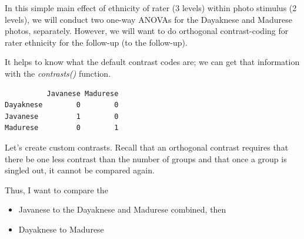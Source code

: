\documentclass[
  11pt,
]{book}
\newenvironment{Shaded}{\begin{snugshade}}{\end{snugshade}}
\newcommand{\CommentTok}[1]{\textcolor[rgb]{0.56,0.35,0.01}{\textit{#1}}}
\newcommand{\DecValTok}[1]{\textcolor[rgb]{0.00,0.00,0.81}{#1}}
\newcommand{\FunctionTok}[1]{\textcolor[rgb]{0.00,0.00,0.00}{#1}}
\newcommand{\NormalTok}[1]{#1}
\newcommand{\OtherTok}[1]{\textcolor[rgb]{0.56,0.35,0.01}{#1}}
\newcommand{\SpecialCharTok}[1]{\textcolor[rgb]{0.00,0.00,0.00}{#1}}
\providecommand{\tightlist}{%
  \setlength{\itemsep}{0pt}\setlength{\parskip}{0pt}}
\begin{document}
In this simple main effect of ethnicity of rater (3 levels) within photo stimulus (2 levels), we will conduct two one-way ANOVAs for the Dayaknese and Madurese photos, separately. However, we will want to do orthogonal contrast-coding for rater ethnicity for the follow-up (to the follow-up).

It helps to know what the default contrast codes are; we can get that information with the \emph{contrasts()} function.

\begin{Shaded}
\end{Shaded}

\begin{verbatim}
          Javanese Madurese
Dayaknese        0        0
Javanese         1        0
Madurese         0        1
\end{verbatim}

Let's create custom contrasts. Recall that an orthogonal contrast requires that there be one less contrast than the number of groups and that once a group is singled out, it cannot be compared again.

Thus, I want to compare the

\begin{itemize}
\tightlist
\item
  Javanese to the Dayaknese and Madurese combined, then
\item
  Dayaknese to Madurese
\end{itemize}

\begin{Shaded}
\end{Shaded}
\end{document}
